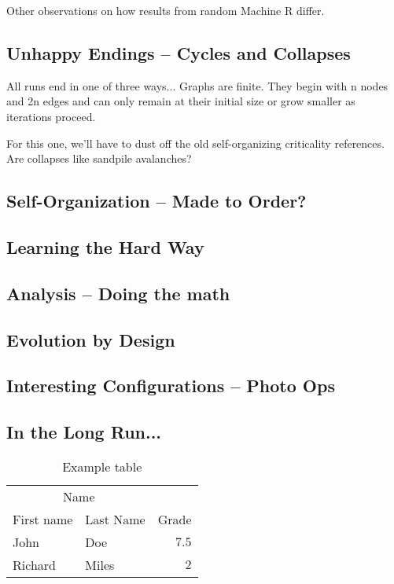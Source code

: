 \documentclass[twoside,twocolumn]{article}
\begin{document}
Other observations on how results from random Machine R differ.

\subsection{Unhappy Endings -- Cycles and Collapses}

All runs end in one of three ways... Graphs are finite. They begin
with n nodes and 2n edges and can only remain at their initial
size or grow smaller as iterations proceed.

For this one, we'll have to dust off the old self-organizing criticality
references. Are collapses like sandpile avalanches?

\subsection{Self-Organization -- Made to Order?}

\subsection{Learning the Hard Way}

\subsection{Analysis -- Doing the math}

\subsection{Evolution by Design}

\subsection{Interesting Configurations -- Photo Ops}

\subsection{In the Long Run...}

\begin{table}
\caption{Example table}
\centering
\begin{tabular}{llr}
\toprule
\multicolumn{2}{c}{Name} \\
\cmidrule(r){1-2}
First name & Last Name & Grade \\
\midrule
John & Doe & $7.5$ \\
Richard & Miles & $2$ \\
\bottomrule
\end{tabular}
\end{table}
\end{document}
